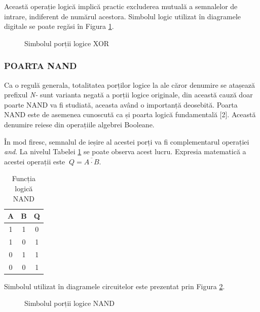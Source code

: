 \documentclass[12pt]{article}
\begin{document}
Această operație logică implică practic excluderea mutuală a semnalelor de intrare, indiferent de numărul acestora. Simbolul logic utilizat în diagramele digitale se poate regăsi în Figura \ref{Figura:8}.
 \begin{figure}[h!]
 \centering
 \caption{Simbolul porții logice XOR}
  \label{Figura:8}
 \end{figure}

\newpage
\subsubsection{POARTA NAND}
Ca o regulă generala, totalitatea porților logice la ale căror denumire se atașează prefixul \textit{N-} sunt varianta negată a porții logice originale, din această cauză doar poarte NAND va fi studiată, aceasta având o importanță deosebită. Poarta NAND este de asemenea cunoscută ca și poarta logică fundamentală [2]. Această denumire reiese din operațiile algebrei Booleane.

 În mod firesc, semnalul de ieșire al acestei porți va fi complementarul operației \textit{and}. La nivelul Tabelei \ref{Tabela:11} se poate observa acest lucru. Expresia matematică a acestei operații este  $\ Q = \overline{A \cdot B}$.
 \begin{table}[h]
\centering
\begin{tabular}{ ||c|c|c|| }
 \hline
 A & B & Q\\ 
 \hline  \hline
 1 & 1 & 0 \\
 \hline
 1 & 0 & 1 \\
 \hline
 0 & 1 & 1 \\
 \hline 
 0 & 0 & 1 \\
 \hline
\end{tabular}
\caption{Funcția logică NAND}
\label{Tabela:11}
\end{table}

Simbolul utilizat în diagramele circuitelor este prezentat prin Figura \ref{Figura:9}.
 \begin{figure}[h!]
 \centering
 \caption{Simbolul porții logice NAND}
 \label{Figura:9}
 \end{figure}
 
\end{document}
